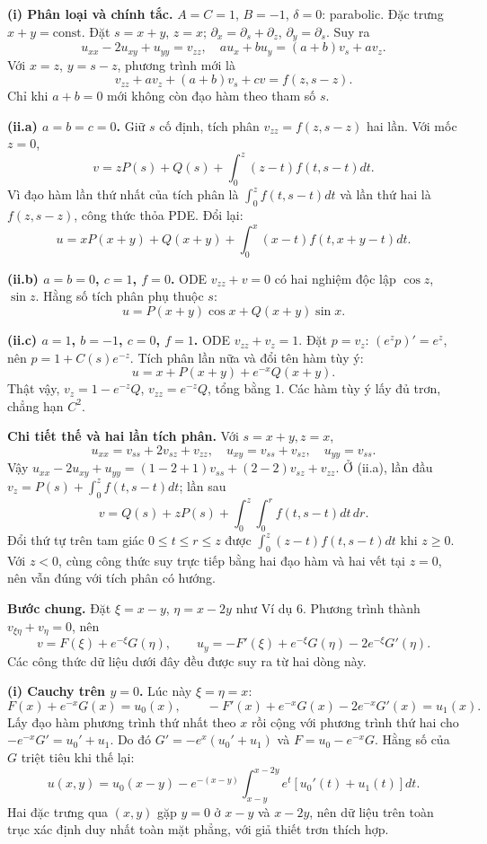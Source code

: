 \textbf{(i) Phân loại và chính tắc.} $A=C=1$, $B=-1$, $\delta=0$: parabolic. Đặc trưng $x+y=\mathrm{const}$. Đặt $s=x+y$, $z=x$; $\partial_x=\partial_s+\partial_z$, $\partial_y=\partial_s$. Suy ra
\[u_{xx}-2u_{xy}+u_{yy}=v_{zz},\quad au_x+bu_y=(a+b)v_s+av_z.\]
Với $x=z$, $y=s-z$, phương trình mới là
\[\boxed{v_{zz}+av_z+(a+b)v_s+cv=f(z,s-z).}\]
Chỉ khi $a+b=0$ mới không còn đạo hàm theo tham số $s$.

\textbf{(ii.a) $a=b=c=0$.} Giữ $s$ cố định, tích phân $v_{zz}=f(z,s-z)$ hai lần. Với mốc $z=0$,
\[v=zP(s)+Q(s)+\int_0^z(z-t)f(t,s-t)dt.\]
Vì đạo hàm lần thứ nhất của tích phân là $\int_0^z f(t,s-t)dt$ và lần thứ hai là $f(z,s-z)$, công thức thỏa PDE. Đổi lại:
\[u=xP(x+y)+Q(x+y)+\int_0^x(x-t)f(t,x+y-t)dt.\]

\textbf{(ii.b) $a=b=0$, $c=1$, $f=0$.} ODE $v_{zz}+v=0$ có hai nghiệm độc lập $\cos z$, $\sin z$. Hằng số tích phân phụ thuộc $s$:
\[\boxed{u=P(x+y)\cos x+Q(x+y)\sin x.}\]

\textbf{(ii.c) $a=1$, $b=-1$, $c=0$, $f=1$.} ODE $v_{zz}+v_z=1$. Đặt $p=v_z$: $(e^zp)'=e^z$, nên $p=1+C(s)e^{-z}$. Tích phân lần nữa và đổi tên hàm tùy ý:
\[\boxed{u=x+P(x+y)+e^{-x}Q(x+y).}\]
Thật vậy, $v_z=1-e^{-z}Q$, $v_{zz}=e^{-z}Q$, tổng bằng $1$. Các hàm tùy ý lấy đủ trơn, chẳng hạn $C^2$.

\textbf{Chi tiết thế và hai lần tích phân.} Với $s=x+y,z=x$,
\[u_{xx}=v_{ss}+2v_{sz}+v_{zz},\quad u_{xy}=v_{ss}+v_{sz},\quad u_{yy}=v_{ss}.\]
Vậy $u_{xx}-2u_{xy}+u_{yy}=(1-2+1)v_{ss}+(2-2)v_{sz}+v_{zz}$. Ở (ii.a), lần đầu $v_z=P(s)+\int_0^zf(t,s-t)dt$; lần sau
\[v=Q(s)+zP(s)+\int_0^z\int_0^r f(t,s-t)dt\,dr.\]
Đổi thứ tự trên tam giác $0\le t\le r\le z$ được $\int_0^z(z-t)f(t,s-t)dt$ khi $z\ge0$. Với $z<0$, cùng công thức suy trực tiếp bằng hai đạo hàm và hai vết tại $z=0$, nên vẫn đúng với tích phân có hướng.

\textbf{Bước chung.} Đặt $\xi=x-y$, $\eta=x-2y$ như Ví dụ 6. Phương trình thành $v_{\xi\eta}+v_\eta=0$, nên
\[v=F(\xi)+e^{-\xi}G(\eta),\qquad
u_y=-F'(\xi)+e^{-\xi}G(\eta)-2e^{-\xi}G'(\eta).\]
Các công thức dữ liệu dưới đây đều được suy ra từ hai dòng này.

\textbf{(i) Cauchy trên $y=0$.} Lúc này $\xi=\eta=x$:
\[F(x)+e^{-x}G(x)=u_0(x),\qquad
-F'(x)+e^{-x}G(x)-2e^{-x}G'(x)=u_1(x).\]
Lấy đạo hàm phương trình thứ nhất theo $x$ rồi cộng với phương trình thứ hai cho $-e^{-x}G'=u_0'+u_1$. Do đó $G'=-e^x(u_0'+u_1)$ và $F=u_0-e^{-x}G$. Hằng số của $G$ triệt tiêu khi thế lại:
\[\boxed{u(x,y)=u_0(x-y)-e^{-(x-y)}\int_{x-y}^{x-2y}e^t[u_0'(t)+u_1(t)]dt.}\]
Hai đặc trưng qua $(x,y)$ gặp $y=0$ ở $x-y$ và $x-2y$, nên dữ liệu trên toàn trục xác định duy nhất toàn mặt phẳng, với giả thiết trơn thích hợp.

